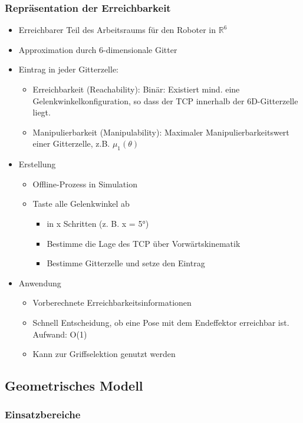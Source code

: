 \documentclass[paper=a4, fontsize=11pt]{scrartcl} %
\numberwithin{equation}{section} %
\numberwithin{figure}{section} %
\numberwithin{table}{section} %
\begin{document}
\subsubsection{Repräsentation der Erreichbarkeit}

\begin{itemize}
\item Erreichbarer Teil des Arbeitsraums für den Roboter in $\mathbb{R}^6$
\item Approximation durch 6-dimensionale Gitter
\item Eintrag in jeder Gitterzelle:
\begin{itemize}
\item Erreichbarkeit (Reachability): Binär: Existiert mind. eine Gelenkwinkelkonfiguration, so dass der TCP innerhalb der 6D-Gitterzelle liegt.
\item Manipulierbarkeit (Manipulability): Maximaler Manipulierbarkeitswert einer Gitterzelle, z.B. $\mu_1(\theta)$
\end{itemize}
\item Erstellung
\begin{itemize}
\item Offline-Prozess in Simulation
\item Taste alle Gelenkwinkel ab
\begin{itemize}
\item in x Schritten (z. B. x = 5°)
\item Bestimme die Lage des TCP über Vorwärtskinematik
\item Bestimme Gitterzelle und setze den Eintrag
\end{itemize}
\end{itemize}
\item Anwendung
\begin{itemize}
\item Vorberechnete Erreichbarkeitsinformationen
\item Schnell Entscheidung, ob eine Pose mit dem Endeffektor erreichbar ist. Aufwand: O(1)
\item Kann zur Griffselektion genutzt werden
\end{itemize}
\end{itemize}

\subsection{Geometrisches Modell}

\subsubsection{Einsatzbereiche}
\end{document}

